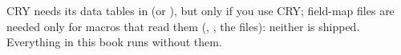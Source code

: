 \begin{checkbuild}
CRY needs its data tables in  (or ), but only if you use CRY; field-map files are needed only for macros that read them (, , the  files): neither is shipped. Everything in this book runs without them.
\end{checkbuild}

